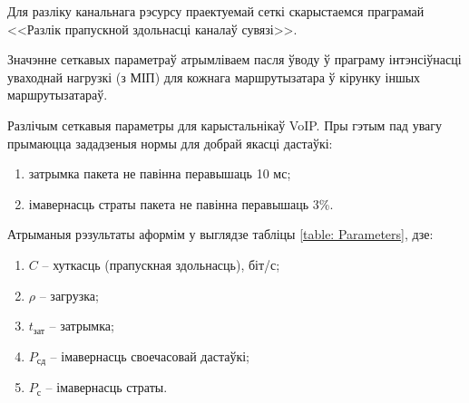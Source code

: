 Для разліку канальнага рэсурсу праектуемай сеткі скарыстаемся
праграмай <<Разлік прапускной здольнасці каналаў сувязі>>.

Значэнне сеткавых параметраў атрымліваем пасля ўводу ў праграму
інтэнсіўнасці уваходнай нагрузкі (з МІП) для кожнага маршрутызатара
ў кірунку іншых маршрутызатараў.

Разлічым сеткавыя параметры для карыстальнікаў VoIP. Пры гэтым пад
увагу прымаюцца зададзеныя нормы для добрай якасці дастаўкі:
\begin{enumerate}
    \item затрымка пакета не павінна перавышаць 10 мс;
    \item імавернасць страты пакета не павінна перавышаць 3\%.
\end{enumerate}

Атрыманыя рэзультаты аформім у выглядзе табліцы
\ref{table: Parameters}, дзе:
\begin{enumerate}
    \item $C$ -- хуткасць (прапускная здольнасць), біт/с;
    \item $\rho$ -- загрузка;
    \item $t_{\text{зат}}$ -- затрымка;
    \item $P_{\text{сд}}$ -- імавернасць своечасовай дастаўкі;
    \item $P_{\text{с}}$ -- імавернасць страты.
\end{enumerate}

